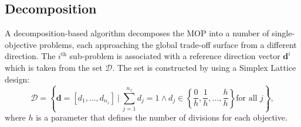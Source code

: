 \documentclass{llncs}
\newcommand{\vd}{\mathbf{d}} %
\newcommand{\DSet}{\mathcal{D}} %
\begin{document}

\subsection{Decomposition}\label{sec:decomposition}

A decomposition-based algorithm decomposes the MOP into a number of single-objective problems, each approaching the global trade-off surface from a different direction. The $i^\textrm{th}$ sub-problem is associated with a reference direction vector $\vd^i$ which is taken from the set $\DSet$. The set is constructed by using a Simplex Lattice design:
\begin{equation}
 \DSet = \left\{ \vd =[d_1,\ldots,d_{n_z}]~ |~ \sum_{j=1}^{n_z} d_j=1 \wedge   d_j\in \left\{\frac{0}{h},\frac{1}{h},\ldots,\frac{h}{h}\right\} \text{for all } j \right\},
 \label{eq:simplex_lattice_design}
\end{equation}
where $h$ is a parameter that defines the number of divisions for each objective.
\end{document}

